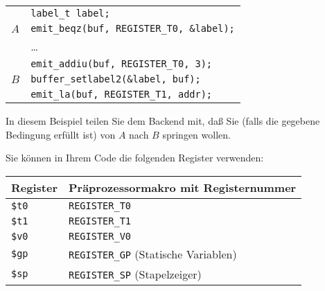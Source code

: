 \documentclass[11pt,a4paper]{article}
\newcommand{\Cty}[1]{\textcolor{dblue}{\texttt{#1}}}
\begin{document}
\vspace{0.5cm}

\begin{tabular}{ll}
&\texttt{\Cty{label\_t} label;}\\
$A$&\texttt{emit\_beqz(buf, REGISTER\_T0, \&label);}\\
&\ldots \\
&\texttt{emit\_addiu(buf, REGISTER\_T0, 3);} \\
$B$&\texttt{buffer\_setlabel2(\&label, buf);} \\
&\texttt{emit\_la(buf, REGISTER\_T1, addr);} \\
\end{tabular}

\vspace{0.5cm}

In diesem Beispiel teilen Sie dem Backend mit, daß Sie (falls die gegebene Bedingung erfüllt ist) von $A$ nach $B$ springen wollen.


Sie können in Ihrem Code die folgenden Register verwenden:

\vspace{0.5cm}

\begin{tabular}{|l|l|}
\hline
\textbf{Register} & \textbf{Präprozessormakro mit Registernummer} \\
\hline
  \texttt{\$t0} & \texttt{REGISTER\_T0} \\
\hline
  \texttt{\$t1} & \texttt{REGISTER\_T1} \\
\hline
  \texttt{\$v0} & \texttt{REGISTER\_V0} \\
\hline
  \texttt{\$gp} & \texttt{REGISTER\_GP} (Statische Variablen) \\
\hline
  \texttt{\$sp} & \texttt{REGISTER\_SP} (Stapelzeiger) \\
\hline
\end{tabular}
\end{document}

